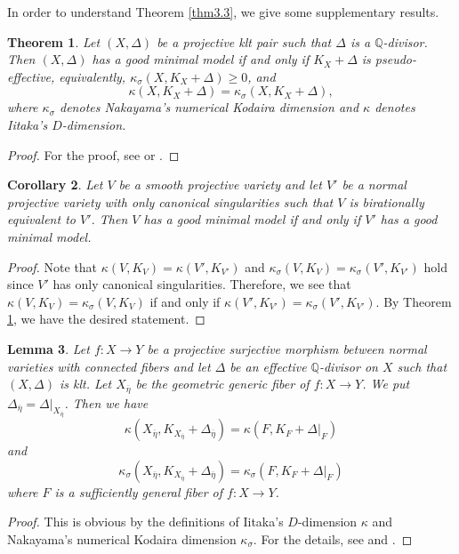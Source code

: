 \documentclass[12pt,twoside]{amsart}
\newtheorem{thm}{Theorem}[section]
\newtheorem{lem}[thm]{Lemma}
\newtheorem{cor}[thm]{Corollary}
\theoremstyle{definition}
\begin{document}
In order to understand Theorem \ref{thm3.3}, we give some supplementary 
results. 

\begin{thm}\label{thm3.4}
Let $(X, \Delta)$ be a projective klt pair such that 
$\Delta$ is a $\mathbb Q$-divisor. 
Then $(X, \Delta)$ has a good minimal model 
if and only if 
$K_X+\Delta$ is pseudo-effective, equivalently, $\kappa _\sigma (X, K_X+\Delta)\geq 0$, 
and 
$$\kappa (X, K_X+\Delta)=\kappa_{\sigma}(X, K_X+\Delta),$$ 
where $\kappa_\sigma$ denotes Nakayama's numerical Kodaira dimension 
and $\kappa$ denotes Iitaka's $D$-dimension.  
\end{thm}
\begin{proof}
For the proof, see \cite[Theorem 4.3]{gongyo-lehmann} or \cite[Remark 2.6]{dhp}. 
\end{proof}

\begin{cor}\label{cor3.5} 
Let $V$ be a smooth projective variety and 
let $V'$ be a normal projective variety with only canonical singularities 
such that $V$ is birationally equivalent to $V'$. 
Then $V$ has a good minimal model if and only if $V'$ 
has a good minimal model. 
\end{cor}
\begin{proof}
Note that $\kappa(V, K_V)=\kappa (V', K_{V'})$ and 
$\kappa _{\sigma}(V, K_V)=\kappa_{\sigma}(V', K_{V'})$ hold since 
$V'$ has only canonical singularities. 
Therefore, we see that $\kappa (V, K_V)=\kappa_{\sigma}(V, K_V)$ if and 
only if $\kappa(V', K_{V'})=\kappa_{\sigma}(V', K_{V'})$. 
By Theorem \ref{thm3.4}, we have the desired statement. 
\end{proof}

\begin{lem}\label{lem3.6}
Let $f:X\to Y$ be a projective surjective morphism between normal 
varieties with connected 
fibers and let $\Delta$ be an effective $\mathbb Q$-divisor on $X$ such that 
$(X, \Delta)$ is klt. 
Let $X_{\overline \eta}$ be the geometric generic fiber of $f:X\to Y$. 
We put $\Delta_{\overline \eta}=\Delta|_{X_{\overline \eta}}$. 
Then we have 
$$
\kappa (X_{\overline \eta}, K_{X_{\overline \eta}}+\Delta_{\overline 
\eta})=\kappa (F, K_F+\Delta|_F)
$$ and 
$$
\kappa_\sigma (X_{\overline \eta}, K_{X_{\overline \eta}}+\Delta_{\overline 
\eta})=\kappa _\sigma(F, K_F+\Delta|_F)
$$ 
where $F$ is a sufficiently general fiber of $f:X\to Y$. 
\end{lem}
\begin{proof}
This is obvious by the definitions of Iitaka's $D$-dimension 
$\kappa$ and Nakayama's numerical Kodaira dimension $\kappa_{\sigma}$. 
For the details, see \cite{nakayama2} and \cite{lehmann}. 
\end{proof}
\end{document}
